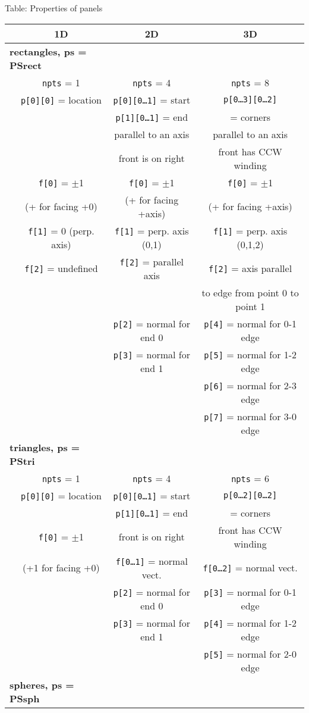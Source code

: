 \documentclass {book}
\newcommand {\ttt} {\texttt}
\begin{document}
Table: Properties of panels

\begin{longtable}[c]{lccc}
&1D&2D&3D\\
\hline
\multicolumn{2}{l}{\textbf{rectangles, ps = PSrect}}\\
&\ttt{npts} = 1&\ttt{npts} = 4&\ttt{npts} = 8\\ 
&\ttt{p[0][0]} = location&\ttt{p[0][0\ldots1]} = start&\ttt{p[0\ldots3][0\ldots2]}\\ 
&&\ttt{p[1][0\ldots1]} = end&= corners\\ 
&&parallel to an axis&parallel to an axis\\ 
&&front is on right&front has CCW winding\\ 
&\ttt{f[0]} = $\pm$1&\ttt{f[0]} = $\pm$1&\ttt{f[0]} = $\pm$1\\ 
&(+ for facing +0)&(+ for facing +axis)&(+ for facing +axis)\\ 
&\ttt{f[1]} = 0 (perp. axis)&\ttt{f[1]} = perp. axis (0,1)&\ttt{f[1]} = perp. axis (0,1,2)\\ 
&\ttt{f[2]} = undefined&\ttt{f[2]} = parallel axis&\ttt{f[2]} = axis parallel\\ 
&&&to edge from point 0 to point 1\\
&&\ttt{p[2]} = normal for end 0&\ttt{p[4]} = normal for 0-1 edge\\
&&\ttt{p[3]} = normal for end 1&\ttt{p[5]} = normal for 1-2 edge\\
&&&\ttt{p[6]} = normal for 2-3 edge\\
&&&\ttt{p[7]} = normal for 3-0 edge\\
\hline
\multicolumn{2}{l}{\textbf{triangles, ps = PStri}}\\
&\ttt{npts} = 1&\ttt{npts} = 4&\ttt{npts} = 6\\ 
&\ttt{p[0][0]} = location&\ttt{p[0][0\ldots1]} = start&\ttt{p[0\ldots2][0\ldots2]}\\ 
&&\ttt{p[1][0\ldots1]} = end&= corners\\ 
&\ttt{f[0]} = $\pm$1&front is on right&front has CCW winding\\ 
&(+1 for facing +0)&\ttt{f[0\ldots1]} = normal vect.&\ttt{f[0\ldots2]} = normal vect.\\
&&\ttt{p[2]} = normal for end 0&\ttt{p[3]} = normal for 0-1 edge\\
&&\ttt{p[3]} = normal for end 1&\ttt{p[4]} = normal for 1-2 edge\\
&&&\ttt{p[5]} = normal for 2-0 edge\\
\hline
\multicolumn{2}{l}{\textbf{spheres, ps = PSsph}}\\

\end{longtable}
\end{document}
